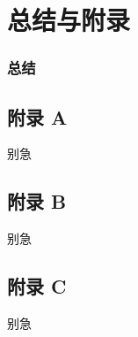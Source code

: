 
\section*{总结与附录}
\begin{frame}
  \frametitle{总结}
\end{frame}
\begin{frame}[c]
  \thankspage
\end{frame}
\subsection*{附录 A}
\begin{frame}{别急}\end{frame} %
\subsection*{附录 B}
\begin{frame}{别急}\end{frame} %
\subsection*{附录 C}
\begin{frame}{别急}\end{frame} %
